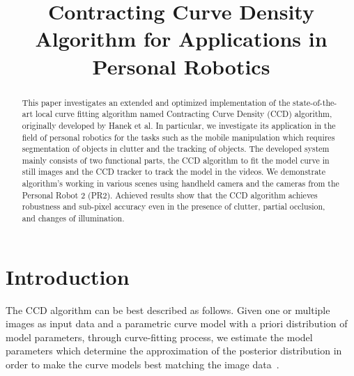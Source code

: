 \documentclass[conference]{IEEEtran}
\begin{document}
%
\title{Contracting Curve Density Algorithm for Applications in Personal Robotics}


\author{
}

\maketitle

\begin{abstract}
This paper investigates an extended and optimized
implementation of the state-of-the-art local curve fitting algorithm
named Contracting Curve Density (CCD) algorithm, originally developed 
by Hanek et al. In particular, we investigate its application  
in the field of personal robotics for the tasks such as the mobile
manipulation which requires segmentation
of objects in clutter and the tracking of objects. 
The developed system mainly consists of two functional parts, the CCD
algorithm to fit the model curve in still images and the CCD tracker to
track the model in the videos. We demonstrate algorithm's working 
in various scenes using handheld camera and the cameras from the 
Personal Robot 2 (PR2). Achieved results show that the CCD algorithm achieves 
robustness and sub-pixel accuracy even in the presence of clutter, 
partial occlusion, and changes of illumination.
\end{abstract}

\IEEEpeerreviewmaketitle

\section{Introduction}
The CCD algorithm can be best described as follows. Given one or multiple images as input
data and a parametric curve model with a priori distribution of model
parameters, through curve-fitting process, we estimate the model
parameters which determine the approximation of the posterior
distribution in order to make the curve models best matching the image 
data~\cite{hanek2004contracting}.
\end{document}
